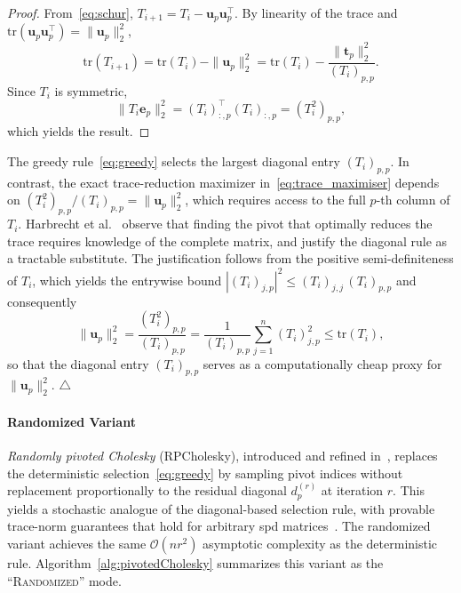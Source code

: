 \documentclass[onefignum,onetabnum]{siamart250211}
\begin{document}
\begin{proof}
From~\eqref{eq:schur}, $T_{i+1} = T_i - \bm{u}_p \bm{u}_p^\top$. By linearity of the trace and $\mathrm{tr}(\bm{u}_p \bm{u}_p^\top) = \|\bm{u}_p\|_2^2$,
\begin{equation*}
\mathrm{tr}(T_{i+1})
= \mathrm{tr}(T_i) - \|\bm{u}_p\|_2^2
= \mathrm{tr}(T_i) - \frac{\|\bm{t}_p\|_2^2}{(T_i)_{p,p}}.
\end{equation*}
Since $T_i$ is symmetric,
\begin{equation*}
    \|T_i \bm{e}_p\|_2^2
    = (T_i)_{:,p}^\top(T_i)_{:,p}
    = (T_i^2)_{p,p},
\end{equation*}
which yields the result.
\end{proof}

\begin{remark}
\label{rem:greedy_proxy}
The greedy rule~\eqref{eq:greedy} selects the largest diagonal entry $(T_i)_{p,p}$. In contrast, the exact trace-reduction maximizer in~\eqref{eq:trace_maximiser} depends on $(T_i^2)_{p,p}/(T_i)_{p,p} = \|\bm{u}_p\|_2^2$, which requires access to the full $p$-th column of $T_i$. Harbrecht et al.~\cite{harbrecht.2012} observe that finding the pivot that optimally reduces the trace requires knowledge of the complete matrix, and justify the diagonal rule as a tractable substitute. The justification follows from the positive semi-definiteness of $T_i$, which yields the entrywise bound $|(T_i)_{j,p}|^2 \leq (T_i)_{j,j}\,(T_i)_{p,p}$ and consequently
\begin{equation*}
    \|\bm{u}_p\|_2^2 = \frac{(T_i^2)_{p,p}}{(T_i)_{p,p}} = \frac{1}{(T_i)_{p,p}} \sum_{j=1}^n (T_i)_{j,p}^2 \leq \mathrm{tr}(T_i),
\end{equation*}
so that the diagonal entry $(T_i)_{p,p}$ serves as a computationally cheap proxy for $\|\bm{u}_p\|_2^2$. \hfill$\triangle$
\end{remark}

\paragraph{Randomized Variant}
\textit{Randomly pivoted Cholesky} (RPCholesky), introduced and refined in~\cite{chen.2025,epperly.2025}, replaces the deterministic selection~\eqref{eq:greedy} by sampling pivot indices without replacement proportionally to the residual diagonal $d^{(r)}_p$ at iteration $r$. This yields a stochastic analogue of the diagonal-based selection rule, with provable trace-norm guarantees that hold for arbitrary spd matrices~\cite{chen.2025}. The randomized variant achieves the same $\mathcal{O}(nr^2)$ asymptotic complexity as the deterministic rule.
Algorithm~\ref{alg:pivotedCholesky} summarizes this variant as the ``\textsc{Randomized}'' mode.
\end{document}

